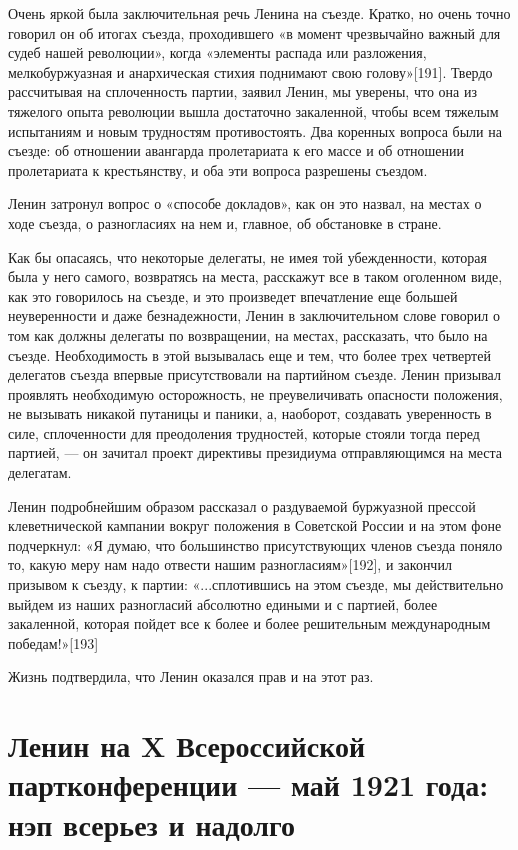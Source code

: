 \documentclass[12pt, a4paper, openany]{book}
\begin{document}
Очень яркой была заключительная речь Ленина на съезде. Кратко, но очень точно говорил он об итогах съезда, проходившего «в момент чрезвычайно важный для судеб нашей революции», когда «элементы распада или разложения, мелкобуржуазная и анархическая стихия поднимают свою голову»[191]. Твердо рассчитывая на сплоченность партии, заявил Ленин, мы уверены, что она из тяжелого опыта революции вышла достаточно закаленной, чтобы всем тяжелым испытаниям и новым трудностям противостоять. Два коренных вопроса были на съезде: об отношении авангарда пролетариата к его массе и об отношении пролетариата к крестьянству, и оба эти вопроса разрешены съездом.

Ленин затронул вопрос о «способе докладов», как он это назвал, на местах о ходе съезда, о разногласиях на нем и, главное, об обстановке в стране.

Как бы опасаясь, что некоторые делегаты, не имея той убежденности, которая была у него самого, возвратясь на места, расскажут все в таком оголенном виде, как это говорилось на съезде, и это произведет впечатление еще большей неуверенности и даже безнадежности, Ленин в заключительном слове говорил о том как должны делегаты по возвращении, на местах, рассказать, что было на съезде. Необходимость в этой вызывалась еще и тем, что более трех четвертей делегатов съезда впервые присутствовали на партийном съезде. Ленин призывал проявлять необходимую осторожность, не преувеличивать опасности положения, не вызывать никакой путаницы и паники, а, наоборот, создавать уверенность в силе, сплоченности для преодоления трудностей, которые стояли тогда перед партией, — он зачитал проект директивы президиума отправляющимся на места делегатам.

Ленин подробнейшим образом рассказал о раздуваемой буржуазной прессой клеветнической кампании вокруг положения в Советской России и на этом фоне подчеркнул: «Я думаю, что большинство присутствующих членов съезда поняло то, какую меру нам надо отвести нашим разногласиям»[192], и закончил призывом к съезду, к партии: «...сплотившись на этом съезде, мы действительно выйдем из наших разногласий абсолютно едиными и с партией, более закаленной, которая пойдет все к более и более решительным международным победам!»[193]

Жизнь подтвердила, что Ленин оказался прав и на этот раз.

\newpage
\section[Ленин на X Всероссийской партконференции — май 1921 года: нэп всерьез и надолго]{\center \textbf{Ленин на X Всероссийской партконференции — май 1921 года: нэп всерьез и надолго}}
\end{document}
